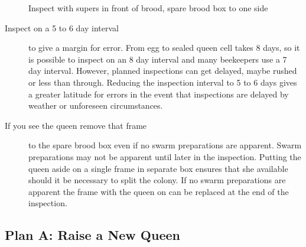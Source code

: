 \begin{figure}[H]
\centering
{}
\caption{Inspect with supers in front of brood, spare brood box to one side}%
\end{figure}

\begin{description}
	\item [Inspect on a 5 to 6 day interval] to give a margin for error.
		From egg to sealed queen cell takes 8 days, so it is possible to inspect on an 8 day interval and many beekeepers use a 7 day interval.
		However, planned inspections can get delayed, maybe rushed or less than through.
		Reducing the inspection interval to 5 to 6 days gives a greater latitude for errors
		in the event that inspections are delayed by weather or unforeseen circumstances.
	\item [If you see the queen remove that frame] to the spare brood box even if no swarm preparations are apparent.
		Swarm preparations may not be apparent until later in the inspection.
		Putting the queen aside on a single frame in separate box ensures that she available should it be necessary to split the colony.
		If no swarm preparations are apparent the frame with the queen on can be replaced at the end of the inspection.
\end{description}

\subsection{Plan A: Raise a New Queen}

